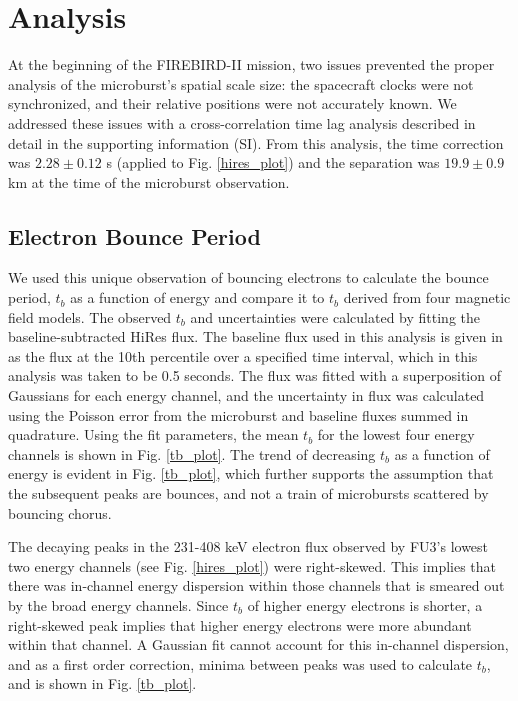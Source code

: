 \documentclass[draft, linenumbers]{agujournal}
\begin{document}
\section{Analysis} \label{analysis} %
At the beginning of the FIREBIRD-II mission, two issues prevented the proper analysis of the microburst's spatial scale size: the spacecraft clocks were not synchronized, and their relative positions were not accurately known. We addressed these issues with a cross-correlation time lag analysis described in detail in the supporting information (SI). From this analysis, the time correction was $2.28 \pm 0.12$ s (applied to Fig. \ref{hires_plot}) and the separation was $19.9 \pm 0.9$ km at the time of the microburst observation.

\subsection{Electron Bounce Period} \label{t_b} %
We used this unique observation of bouncing electrons to calculate the bounce period, $t_b$ as a function of energy and compare it to $t_b$ derived from four magnetic field models. The observed $t_b$ and uncertainties were calculated by fitting the baseline-subtracted HiRes flux. The baseline flux used in this analysis is given in \citet{O'Brien2004} as the flux at the 10th percentile over a specified time interval, which in this analysis was taken to be 0.5 seconds. The flux was fitted with a superposition of Gaussians for each energy channel, and the uncertainty in flux was calculated using the Poisson error from the microburst and baseline fluxes summed in quadrature. Using the fit parameters, the mean $t_b$ for the lowest four energy channels is shown in Fig. \ref{tb_plot}. The trend of decreasing $t_b$ as a function of energy is evident in Fig. \ref{tb_plot}, which further supports the assumption that the subsequent peaks are bounces, and not a train of microbursts scattered by bouncing chorus. 

The decaying peaks in the 231-408 keV electron flux observed by FU3's lowest two energy channels (see Fig. \ref{hires_plot}) were right-skewed. This implies that there was in-channel energy dispersion within those channels that is smeared out by the broad energy channels. Since $t_b$ of higher energy electrons is shorter, a right-skewed peak implies that higher energy electrons were more abundant within that channel. A Gaussian fit cannot account for this in-channel dispersion, and as a first order correction, minima between peaks was used to calculate $t_b$, and is shown in Fig. \ref{tb_plot}. 
\end{document}
